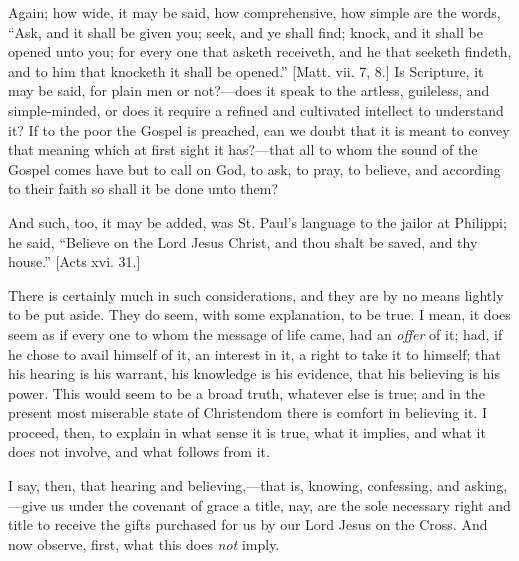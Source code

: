 Again; how wide, it may be said, how comprehensive, how simple are
the words, ``Ask, and it shall be given you; seek, and ye shall
find; knock, and it shall be opened unto you; for every one that
asketh receiveth, and he that seeketh findeth, and to him that
knocketh it shall be opened.'' [Matt. vii. 7, 8.] Is Scripture, it
may be said, for plain men or not?—does it speak to the artless,
guileless, and simple-minded, or does it require a refined and
cultivated intellect to understand it? If to the poor the Gospel is
preached, can we doubt that it is meant to convey that meaning which
at first sight it has?—that all to whom the sound of the Gospel
comes have but to call on God, to ask, to pray, to believe, and
according to their faith so shall it be done unto them?

And such, too, it may be added, was St. Paul's language to the
jailor at Philippi; he said, ``Believe on the Lord Jesus Christ,
and thou shalt be saved, and thy house.'' [Acts xvi. 31.]

There is certainly much in such considerations, and they are by no
means lightly to be put aside. They do seem, with some explanation, to
be true. I mean, it does seem as if every one to whom the message of
life came, had an \emph{offer} of it; had, if he chose to avail
himself of it, an interest in it, a right to take it to himself; that
his hearing is his warrant, his knowledge is his evidence, that his
believing is his power. This would seem to be a broad truth, whatever
else is true; and in the present most miserable state of Christendom
there is comfort in believing it. I proceed, then, to explain in what
sense it is true, what it implies, and what it does not involve, and
what follows from it.

I say, then, that hearing and believing,—that is, knowing,
confessing, and asking,—give us under the covenant of grace a title,
nay, are the sole necessary right and title to receive the gifts
purchased for us by our Lord Jesus on the Cross. And now observe,
first, what this does \emph{not} imply.

